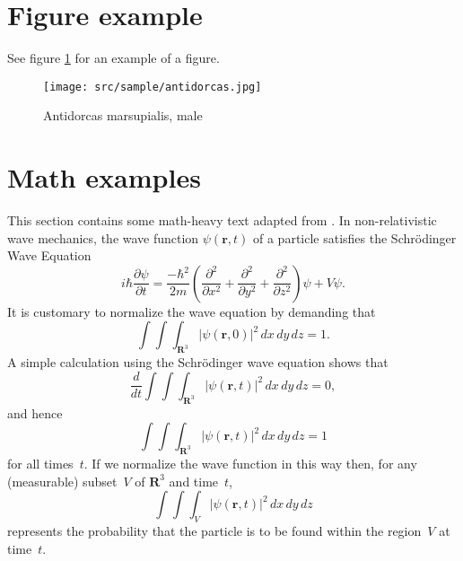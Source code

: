 \section{Figure example}

See figure \ref{figure\arabic{figurecounter}} for an example of a figure.

\begin{figure}
\texttt{[image: src/sample/antidorcas.jpg]}
\caption{Antidorcas marsupialis, male}
\label{figure\arabic{figurecounter}}
\end{figure}
\clearpage
\section{Math examples}

This section contains some math-heavy text adapted from \iftoggle{usebiblatex}{\textcite{dwilkins1995}}{\citet{dwilkins1995}}.
In non-relativistic wave mechanics, the wave function $\psi(\mathbf{r},t)$ of a particle satisfies the Schrödinger Wave Equation
%
\begin{equation}
 i\hbar\frac{\partial \psi}{\partial t}
  = \frac{-\hbar^2}{2m} \left(
    \frac{\partial^2}{\partial x^2}
    + \frac{\partial^2}{\partial y^2}
    + \frac{\partial^2}{\partial z^2}
  \right) \psi + V \psi.
\end{equation}
%
It is customary to normalize the wave equation by
demanding that
%
\begin{equation}
\int \!\!\! \int \!\!\! \int_{\textbf{R}^3}
      \left| \psi(\mathbf{r},0) \right|^2\,dx\,dy\,dz = 1.
\end{equation}
%
A simple calculation using the Schr\"{o}dinger wave
equation shows that
%
\begin{equation}
\frac{d}{dt} \int \!\!\! \int \!\!\! \int_{\textbf{R}^3}
      \left| \psi(\mathbf{r},t) \right|^2\,dx\,dy\,dz = 0,
\end{equation}
%
and hence
%
\begin{equation}
\int \!\!\! \int \!\!\! \int_{\textbf{R}^3}
      \left| \psi(\mathbf{r},t) \right|^2\,dx\,dy\,dz = 1
\end{equation}
%
for all times~$t$. If we normalize the wave function in this
way then, for any (measurable) subset~$V$ of $\textbf{R}^3$
and time~$t$,
%
\begin{equation}
\int \!\!\! \int \!\!\! \int_V
      \left| \psi(\mathbf{r},t) \right|^2\,dx\,dy\,dz
\end{equation}
%
represents the probability that the particle is to be found
within the region~$V$ at time~$t$.

